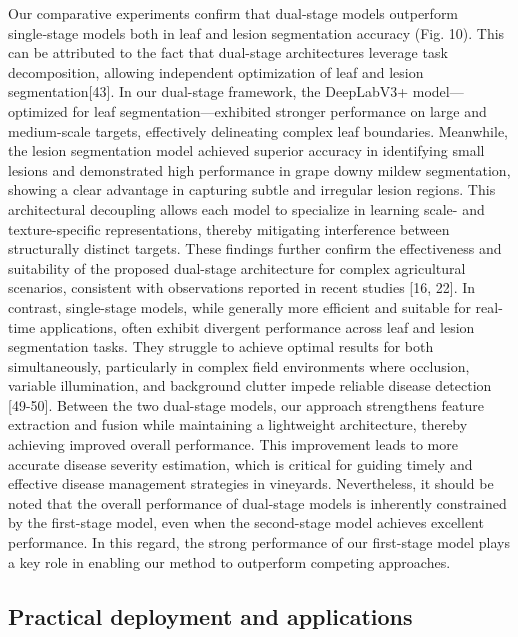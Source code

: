\documentclass[
]{article}
\begin{document}
Our comparative experiments confirm that dual‑stage models outperform
single‑stage models both in leaf and lesion segmentation accuracy (Fig.
10). This can be attributed to the fact that dual-stage architectures
leverage task decomposition, allowing independent optimization of leaf
and lesion segmentation{[}43{]}. In our dual-stage framework, the
DeepLabV3+ model---optimized for leaf segmentation---exhibited stronger
performance on large and medium-scale targets, effectively delineating
complex leaf boundaries. Meanwhile, the lesion segmentation model
achieved superior accuracy in identifying small lesions and demonstrated
high performance in grape downy mildew segmentation, showing a clear
advantage in capturing subtle and irregular lesion regions. This
architectural decoupling allows each model to specialize in learning
scale- and texture-specific representations, thereby mitigating
interference between structurally distinct targets. These findings
further confirm the effectiveness and suitability of the proposed
dual-stage architecture for complex agricultural scenarios, consistent
with observations reported in recent studies {[}16, 22{]}. In contrast,
single-stage models, while generally more efficient and suitable for
real-time applications, often exhibit divergent performance across leaf
and lesion segmentation tasks. They struggle to achieve optimal results
for both simultaneously, particularly in complex field environments
where occlusion, variable illumination, and background clutter impede
reliable disease detection {[}49-50{]}. Between the two dual-stage
models, our approach strengthens feature extraction and fusion while
maintaining a lightweight architecture, thereby achieving improved
overall performance. This improvement leads to more accurate disease
severity estimation, which is critical for guiding timely and effective
disease management strategies in vineyards. Nevertheless, it should be
noted that the overall performance of dual-stage models is inherently
constrained by the first-stage model, even when the second-stage model
achieves excellent performance. In this regard, the strong performance
of our first-stage model plays a key role in enabling our method to
outperform competing approaches.

\hypertarget{practical-deployment-and-applications}{%
\subsection{Practical deployment and
applications}\label{practical-deployment-and-applications}}
\end{document}
